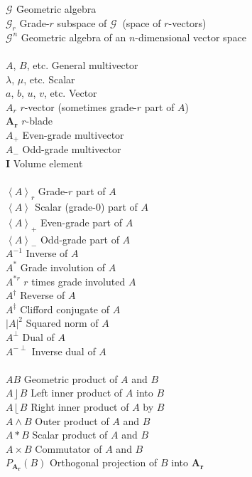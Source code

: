 \documentclass{utarticle}
\newcommand{\G}[1][]{\ensuremath{\mathcal{G}_{#1}}}
\newcommand{\bl}[1]{\ensuremath{\bm{#1}}}
\newcommand{\I}{\bl{I}}
\DeclareMathOperator{\lin}{\rfloor}
\DeclareMathOperator{\rin}{\lfloor}
\DeclareMathOperator{\out}{\wedge}
\newcommand{\grinv}[2][]{\ensuremath{#2^{*#1}}}
\newcommand{\rev}[1]{\ensuremath{#1^\dagger}}
\newcommand{\clifconj}[1]{\ensuremath{#1^\ddagger}}
\newcommand{\scprod}[2]{\ensuremath{#1 * #2}}
\newcommand{\commute}[2]{\ensuremath{#1 \times #2}}
\newcommand{\grade}[2][]{\ensuremath{\left\langle #2 \right\rangle_{#1}}}
\newcommand{\dual}[1]{\ensuremath{#1^\perp}}
\newcommand{\invdual}[1]{\ensuremath{#1^{-\perp}}}
\begin{document}
\begin{tabbing}
\G \hspace{.85in} \= Geometric algebra \\
\G[r] \> Grade-$r$ subspace of \G\ (space of $r$-vectors) \\
$\G^n$ \> Geometric algebra of an $n$-dimensional vector space \\ 
\\
$A$, $B$, etc. \> General multivector \\
$\lambda$, $\mu$, etc. \> Scalar \\
$a$, $b$, $u$, $v$, etc. \> Vector \\
$A_r$ \> $r$-vector (sometimes grade-$r$ part of $A$) \\
\bl{A_r} \> $r$-blade \\
$A_+$ \> Even-grade multivector \\
$A_-$ \> Odd-grade multivector \\
\I \> Volume element \\ 
\\
\grade[r]{A} \> Grade-$r$ part of $A$ \\
\grade{A} \> Scalar (grade-$0$) part of $A$ \\
\grade[+]{A} \> Even-grade part of $A$ \\
\grade[-]{A} \> Odd-grade part of $A$ \\
$A^{-1}$ \> Inverse of $A$ \\
\grinv{A} \> Grade involution of $A$ \\
\grinv[r]{A} \> $r$ times grade involuted $A$ \\
\rev{A} \> Reverse of $A$ \\
\clifconj{A} \> Clifford conjugate of $A$ \\
$|A|^2$ \> Squared norm of $A$ \\
\dual{A} \> Dual of $A$ \\
\invdual{A} \> Inverse dual of $A$ \\
\\
$AB$ \> Geometric product of $A$ and $B$ \\
$A \lin B$ \> Left inner product of $A$ into $B$ \\
$A \rin B$ \> Right inner product of $A$ by $B$ \\
$A \out B$ \> Outer product of $A$ and $B$ \\
\scprod{A}{B} \> Scalar product of $A$ and $B$ \\
\commute{A}{B} \> Commutator of $A$ and $B$ \\
$P_{\bl{A_r}}(B)$ \> Orthogonal projection of $B$ into \bl{A_r} \\

\end{tabbing}
\end{document}
